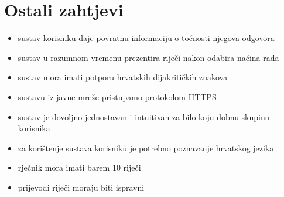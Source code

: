 \section{Ostali zahtjevi}

\begin{itemize}
\item sustav korisniku daje povratnu informaciju o točnosti njegova odgovora
\item sustav u razumnom vremenu prezentira riječi nakon odabira načina rada
\item sustav mora imati potporu hrvatskih dijakritičkih znakova
\item sustavu iz javne mreže pristupamo protokolom HTTPS
\item sustav je dovoljno jednostavan i intuitivan za bilo koju dobnu skupinu korisnika 
\item za korištenje sustava korisniku je potrebno poznavanje hrvatskog jezika
\item rječnik mora imati barem 10 riječi
\item prijevodi riječi moraju biti ispravni
\end{itemize}
			 
			 
			 
	